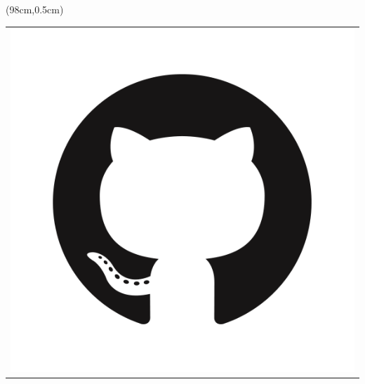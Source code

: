 \documentclass[a0,landscape]{a0poster}
\begin{document}
\begin{minipage}[b]{\linewidth}
	\begin{textblock*}{12cm}(98cm,0.5cm)
		\begin{tabular}{l}
			\href{https://github.com/OttaviaE/implicitMeasures}{\includegraphics[width=\linewidth]{github.png}}
		\end{tabular}
	
\end{textblock*}

\end{minipage}
%


\setlength{\columnseprule}{0.4pt}
\end{document}
